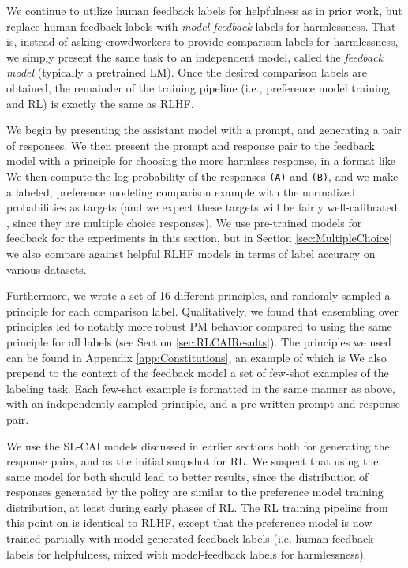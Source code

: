We continue to utilize human feedback labels for helpfulness as in prior work, but replace human feedback labels with {\it model feedback} labels for harmlessness. That is, instead of asking crowdworkers to provide comparison labels for harmlessness, we simply present the same task to an independent model, called the {\it feedback model} (typically a pretrained LM). Once the desired comparison labels are obtained, the remainder of the training pipeline (i.e., preference model training and RL) is exactly the same as RLHF.

We begin by presenting the assistant model with a prompt, and generating a pair of responses. We then present the prompt and response pair to the feedback model with a principle for choosing the more harmless response, in a format like We then compute the log probability of the responses \texttt{(A)} and \texttt{(B)}, and we make a labeled, preference modeling comparison example with the normalized probabilities as targets (and  we expect these targets will be fairly well-calibrated \cite{LMsKnowWhatTheyKnow}, since they are multiple choice responses). We use pre-trained models for feedback for the experiments in this section, but in Section \ref{sec:MultipleChoice} we also compare against helpful RLHF models in terms of label accuracy on various datasets.

Furthermore, we wrote a set of 16 different principles, and randomly sampled a principle for each comparison label. Qualitatively, we found that ensembling over principles led to notably more robust PM behavior compared to using the same principle for all labels (see Section \ref{sec:RLCAIResults}). The principles we used can be found in Appendix \ref{app:Constitutions}, an example of which is We also prepend to the context of the feedback model a set of few-shot examples of the labeling task. Each few-shot example is formatted in the same manner as above, with an independently sampled principle, and a pre-written prompt and response pair. 

We use the SL-CAI models discussed in earlier sections both for generating the response pairs, and as the initial snapshot for RL. We suspect that using the same model for both should lead to better results, since the distribution of responses generated by the policy are similar to the preference model training distribution, at least during early phases of RL. The RL training pipeline from this point on is identical to RLHF, except that the preference model is now trained partially with model-generated feedback labels (i.e. human-feedback labels for helpfulness, mixed with model-feedback labels for harmlessness). 

